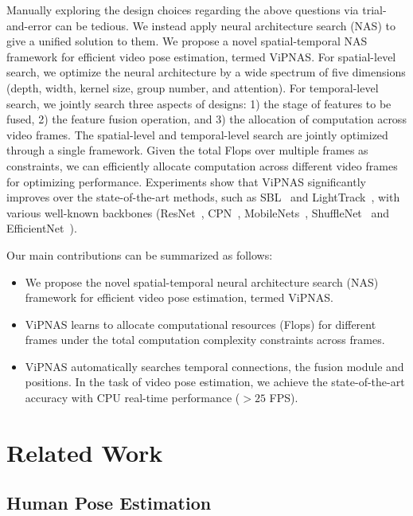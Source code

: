 \documentclass[final]{cvpr}
\begin{document}
Manually exploring the design choices regarding the above questions via trial-and-error can be tedious. We instead apply neural architecture search (NAS) to give a unified solution to them. We propose a novel spatial-temporal NAS framework for efficient video pose estimation, termed ViPNAS. 
For spatial-level search, we optimize the neural architecture by a wide spectrum of five dimensions (depth, width, kernel size, group number, and attention). For temporal-level search, we jointly search three aspects of designs: 1) the stage of features to be fused, 2) the feature fusion operation, and 3) the allocation of computation across video frames. The spatial-level and temporal-level search are jointly optimized through a single framework. Given the total Flops over multiple frames as constraints, we can efficiently allocate computation across different video frames for optimizing performance. Experiments show that ViPNAS significantly improves over the state-of-the-art methods, such as SBL~\cite{xiao2018simple} and LightTrack~\cite{ning2019lighttrack}, with various well-known backbones (ResNet~\cite{he2016deep}, CPN~\cite{chen2018cascaded}, MobileNets~\cite{howard2017mobilenets,howard2019searching}, ShuffleNet~\cite{ma2018shufflenet} and EfficientNet~\cite{tan2019efficientnet}).

Our main contributions can be summarized as follows:
\begin{itemize}
\item We propose the novel spatial-temporal neural architecture search (NAS) framework for efficient video pose estimation, termed ViPNAS. 
\item ViPNAS learns to allocate computational resources (\eg Flops) for different frames under the total computation complexity constraints across frames.
\item ViPNAS automatically searches temporal connections, \ie the fusion module and positions. In the task of video pose estimation, we achieve the state-of-the-art accuracy with CPU real-time performance ($>25$ FPS).
\end{itemize}
\section{Related Work}

\subsection{Human Pose Estimation}
\end{document}

